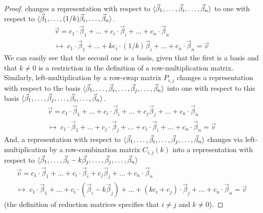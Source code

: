\begin{proof}
changes a representation with respect to
\( \langle\vec{\beta}_1,\dots,\vec{\beta}_i,\dots,\vec{\beta}_n \rangle \)
to one with respect to
\( \langle\vec{\beta}_1,\dots,(1/k)\vec{\beta}_i,\dots,\vec{\beta}_n \rangle \).
\begin{multline*}
   \vec{v}= c_1\cdot\vec{\beta}_1+\dots+c_i\cdot\vec{\beta}_i
                                   +\dots+c_n\cdot\vec{\beta}_n  
   \\  \mapsto\;                                                       
    c_1\cdot\vec{\beta}_1+\dots+kc_i\cdot(1/k)\vec{\beta}_i+\dots
                                  +c_n\cdot\vec{\beta}_n=\vec{v}     
\end{multline*}
We can easily see that the second one is a basis, given that the first is a 
basis and that $k\neq 0$ is a restriction in the definition of a 
row-multiplication matrix.
Similarly, left-multiplication by a row-swap matrix $P_{i,j}$
changes a representation with respect to the basis
\( \langle\vec{\beta}_1,\dots,\vec{\beta}_i,\dots,\vec{\beta}_j,
  \dots,\vec{\beta}_n \rangle \)
into one with respect to this basis
\( \langle\vec{\beta}_1,\dots,\vec{\beta}_j,\dots,\vec{\beta}_i,
  \dots,\vec{\beta}_n \rangle \).
\begin{multline*}
   \vec{v}= c_1\cdot\vec{\beta}_1+\dots+c_i\cdot\vec{\beta}_i
                   +\dots+c_j\vec{\beta}_j+\dots+c_n\cdot\vec{\beta}_n  
   \\  \mapsto\;                                                       
    c_1\cdot\vec{\beta}_1+\dots+c_j\cdot\vec{\beta}_j+\dots
               +c_i\cdot\vec{\beta}_i+\dots+c_n\cdot\vec{\beta}_n=\vec{v}     
\end{multline*}
And, a representation with respect to
\( \langle\vec{\beta}_1,\dots,\vec{\beta}_i,\dots,\vec{\beta}_j,
  \dots,\vec{\beta}_n \rangle \)
changes via left-multiplication by a row-combination matrix
$C_{i,j}(k)$ into a representation with respect to 
\( \langle\vec{\beta}_1,\dots,\vec{\beta}_i-k\vec{\beta}_j,
  \dots,\vec{\beta}_j,\dots,\vec{\beta}_n \rangle \)
\begin{multline*}
   \vec{v}= c_1\cdot\vec{\beta}_1+\dots+c_i\cdot\vec{\beta}_i
                       +c_j\vec{\beta}_j+\dots+c_n\cdot\vec{\beta}_n  
   \\  \mapsto\;                                                       
    c_1\cdot\vec{\beta}_1+\dots+c_i\cdot(\vec{\beta}_i-k\vec{\beta}_j)+\dots
          +(kc_i+c_j)\cdot\vec{\beta}_j+\dots+c_n\cdot\vec{\beta}_n=\vec{v} 
\end{multline*}
(the definition of reduction matrices specifies that \( i\neq j \) and
\( k\neq 0 \)).
\end{proof}

